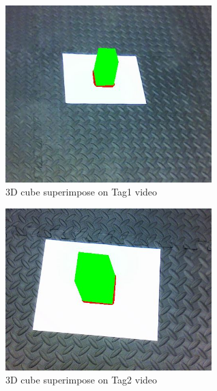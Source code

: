 \documentclass[12pt]{article}
\begin{document}
\begin{figure}[h]
    \centering
    \includegraphics[width=8cm]{Tag1_cube}
    \caption{3D cube superimpose on Tag1 video}
    \label{fig:video frame output}
\end{figure}
\begin{figure}[h]
    \centering
    \includegraphics[width=8cm]{Tag2_cube}
    \caption{3D cube superimpose on Tag2 video}
    \label{fig:video frame output}
\end{figure}
\end{document}
